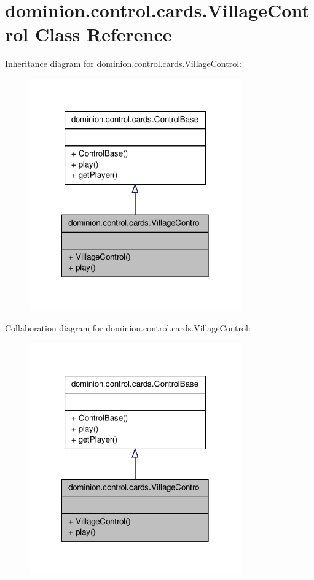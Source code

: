 \hypertarget{classdominion_1_1control_1_1cards_1_1VillageControl}{\section{dominion.\-control.\-cards.\-Village\-Control \-Class \-Reference}
\label{classdominion_1_1control_1_1cards_1_1VillageControl}
}


\-Inheritance diagram for dominion.\-control.\-cards.\-Village\-Control\-:
\nopagebreak
\begin{figure}[H]
\begin{center}
\leavevmode
\includegraphics[width=258pt]{classdominion_1_1control_1_1cards_1_1VillageControl__inherit__graph}
\end{center}
\end{figure}


\-Collaboration diagram for dominion.\-control.\-cards.\-Village\-Control\-:
\nopagebreak
\begin{figure}[H]
\begin{center}
\leavevmode
\includegraphics[width=258pt]{classdominion_1_1control_1_1cards_1_1VillageControl__coll__graph}
\end{center}
\end{figure}
